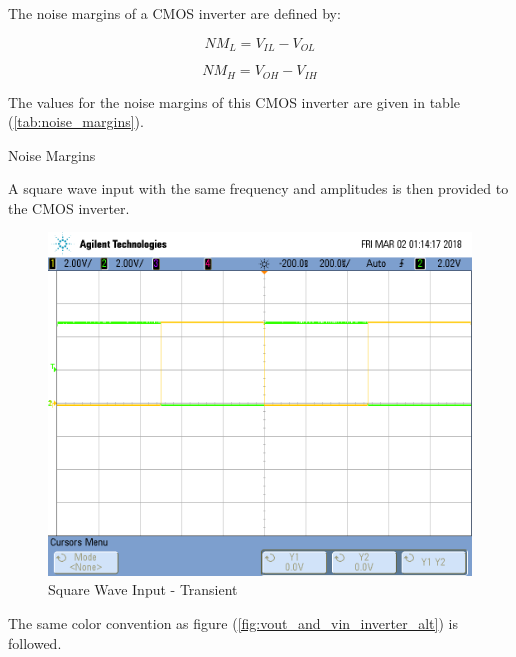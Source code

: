 The noise margins of a CMOS inverter are defined by:

\begin{equation}
	\label{eq:nml}
	NM_{L} = V_{IL} - V_{OL}
\end{equation}

\begin{equation}
	\label{eq:nmh}
	NM_{H} = V_{OH} - V_{IH}
\end{equation}

The values for the noise margins of this CMOS inverter are given in table (\ref{tab:noise_margins}).

\FloatBarrier

\begin{table}[h!]
	\centering
	\caption{Noise Margins}
	\label{tab:noise_margins}
\end{table}

\FloatBarrier

A square wave input with the same frequency and amplitudes is then provided to the CMOS inverter.

\FloatBarrier

\begin{figure}[h!]
	\centering
	\includegraphics[scale=0.50]{../images/square_wave_inverter.png}
	\caption{Square Wave Input - Transient}
	\label{fig:square_wave_inverter}
\end{figure}

\FloatBarrier

{\footnotesize The same color convention as figure (\ref{fig:vout_and_vin_inverter_alt}) is followed.}

